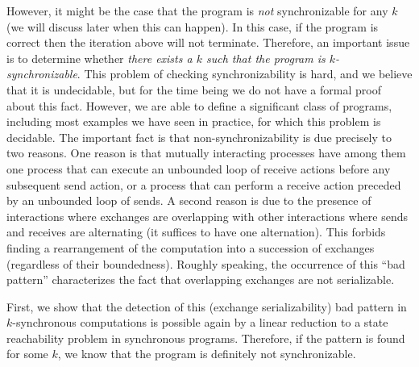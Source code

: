 However, it might be the case that the program is {\em not} synchronizable for any $k$ (we will discuss later when this can happen). In this case, if the program is correct then the iteration above will not terminate. Therefore, an important issue is to determine whether {\em there exists a $k$ such that the program is $k$-synchronizable}. This problem of checking synchronizability is hard, and we believe that it is undecidable, but for the time being we do not have a formal proof about this fact. However, we are able to define a significant class of programs, including most examples we have seen in practice, for which this problem is decidable.  The important fact is that non-synchronizability is due precisely to two reasons. One reason is that mutually interacting processes have among them one process that can execute an unbounded loop of receive actions before any subsequent send action, or a process that can perform a receive action preceded by an unbounded loop of sends. 
A second reason is due to the presence of interactions where exchanges are overlapping with other interactions where sends and receives are alternating (it suffices to have one alternation). This forbids finding a rearrangement of the computation into a succession of exchanges (regardless of their boundedness). Roughly speaking, the occurrence of this “bad pattern” characterizes the fact that overlapping exchanges are not serializable. 

First, we show that the detection of this (exchange serializability) bad pattern in $k$-synchronous computations is possible again by a linear reduction to a state reachability problem in synchronous programs. Therefore, if the pattern is found for some $k$, we know that the program is definitely not synchronizable. 


